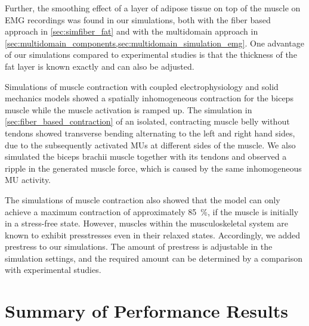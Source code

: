 Further, the smoothing effect of a layer of adipose tissue on top of the muscle on EMG recordings was found in our simulations, both with the fiber based approach in \cref{sec:simfiber_fat} and with the multidomain approach in \cref{sec:multidomain_components,sec:multidomain_simulation_emg}. One advantage of our simulations compared to experimental studies is that the thickness of the fat layer is known exactly and can also be adjusted.

Simulations of muscle contraction with coupled electrophysiology and solid mechanics models showed a spatially inhomogeneous contraction  for the biceps muscle while the muscle activation is ramped up. The simulation in \cref{sec:fiber_based_contraction} of an isolated, contracting muscle belly without tendons showed transverse bending alternating to the left and right hand sides, due to the subsequently activated MUs at different sides of the muscle. We also simulated the biceps brachii muscle together with its tendons and observed a ripple in the generated muscle force, which is caused by the same inhomogeneous MU activity.

The simulations of muscle contraction also showed that the model can only achieve a maximum contraction of approximately \SI{85}{\percent}, if the muscle is initially in a stress-free state. However, muscles within the musculoskeletal system are known to exhibit presstresses even in their relaxed states. Accordingly, we added prestress to our simulations. The amount of prestress is adjustable in the simulation settings, and the required amount can be determined by a comparison with experimental studies.


\section{Summary of Performance Results}\label{sec:observations_performance}

